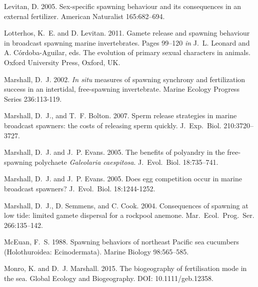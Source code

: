 \documentclass{article}
\begin{document}
\begin{thebibliography}{}
Levitan, D. 2005.
\newblock Sex-specific spawning behaviour and its consequences in an external fertilizer.
\newblock American Naturalist 165:682--694.

Lotterhos, K.~E. and D. Levitan. 2011.
\newblock Gamete release and spawning behaviour in broadcast spawning marine invertebrates.
\newblock Pages 99--120 \emph{in} J.~L. Leonard and A. C\'{o}rdoba-Aguilar, eds. The evolution of primary sexual characters in animals. Oxford University Press, Oxford, UK.

Marshall, D.~J. 2002.
\newblock \textit{In situ} measures of spawning synchrony and fertilization success in an intertidal, free-spawning invertebrate.
\newblock Marine Ecology Progress Series 236:113-119.

Marshall, D.~J., and T.~F. Bolton. 2007.
\newblock Sperm release strategies in marine broadcast spawners: the costs of releasing sperm quickly.
\newblock J.~Exp.~Biol. 210:3720--3727.

Marshall, D.~J. and J.~P. Evans. 2005.
\newblock The benefits of polyandry in the free-spawning polychaete \textit{Galeolaria caespitosa}.
\newblock J.~Evol.~Biol. 18:735--741.

Marshall, D.~J. and J.~P. Evans. 2005.
\newblock Does egg competition occur in marine broadcast spawners? 
\newblock J.~Evol.~Biol. 18:1244-1252.

Marshall, D.~J., D. Semmens, and C. Cook. 2004.
\newblock Consequences of spawning at low tide: limited gamete dispersal for a rockpool anemone.
\newblock Mar.~Ecol.~Prog.~Ser. 266:135--142.

McEuan, F.~S. 1988.
\newblock Spawning behaviors of northeast Pacific sea cucumbers (Holothuroidea: Ecinodermata).
\newblock Marine Biology 98:565--585.

Monro, K. and D.~J. Marshall. 2015.
\newblock The biogeography of fertilisation mode in the sea.
\newblock Global Ecology and Biogeography. DOI: 10.1111/geb.12358.


\end{thebibliography}
\end{document}
